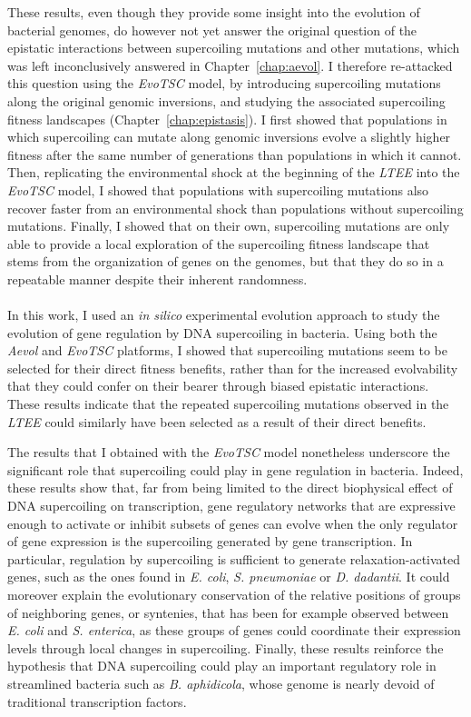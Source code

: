 These results, even though they provide some insight into the evolution of bacterial genomes, do however not yet answer the original question of the epistatic interactions between supercoiling mutations and other mutations, which was left inconclusively answered in Chapter~\ref{chap:aevol}.
I therefore re-attacked this question using the \emph{EvoTSC} model, by introducing supercoiling mutations along the original genomic inversions, and studying the associated supercoiling fitness landscapes (Chapter~\ref{chap:epistasis}).
I first showed that populations in which supercoiling can mutate along genomic inversions evolve a slightly higher fitness after the same number of generations than populations in which it cannot.
Then, replicating the environmental shock at the beginning of the \emph{LTEE} into the \emph{EvoTSC} model, I showed that populations with supercoiling mutations also recover faster from an environmental shock than populations without supercoiling mutations.
Finally, I showed that on their own, supercoiling mutations are only able to provide a local exploration of the supercoiling fitness landscape that stems from the organization of genes on the genomes, but that they do so in a repeatable manner despite their inherent randomness.

\paragraph{} In this work, I used an \emph{in silico} experimental evolution approach to study the evolution of gene regulation by DNA supercoiling in bacteria.
Using both the \emph{Aevol} and \emph{EvoTSC} platforms, I showed that supercoiling mutations seem to be selected for their direct fitness benefits, rather than for the increased evolvability that they could confer on their bearer through biased epistatic interactions.
These results indicate that the repeated supercoiling mutations observed in the \emph{LTEE} could similarly have been selected as a result of their direct benefits.

The results that I obtained with the \emph{EvoTSC} model nonetheless underscore the significant role that supercoiling could play in gene regulation in bacteria.
Indeed, these results show that, far from being limited to the direct biophysical effect of DNA supercoiling on transcription, gene regulatory networks that are expressive enough to activate or inhibit subsets of genes can evolve when the only regulator of gene expression is the supercoiling generated by gene transcription.
In particular, regulation by supercoiling is sufficient to generate relaxation-activated genes, such as the ones found in \emph{E. coli}, \emph{S. pneumoniae} or \emph{D. dadantii}.
It could moreover explain the evolutionary conservation of the relative positions of groups of neighboring genes, or syntenies, that has been for example observed between \emph{E. coli} and \emph{S. enterica}, as these groups of genes could coordinate their expression levels through local changes in supercoiling.
Finally, these results reinforce the hypothesis that DNA supercoiling could play an important regulatory role in streamlined bacteria such as \emph{B. aphidicola}, whose genome is nearly devoid of traditional transcription factors.


